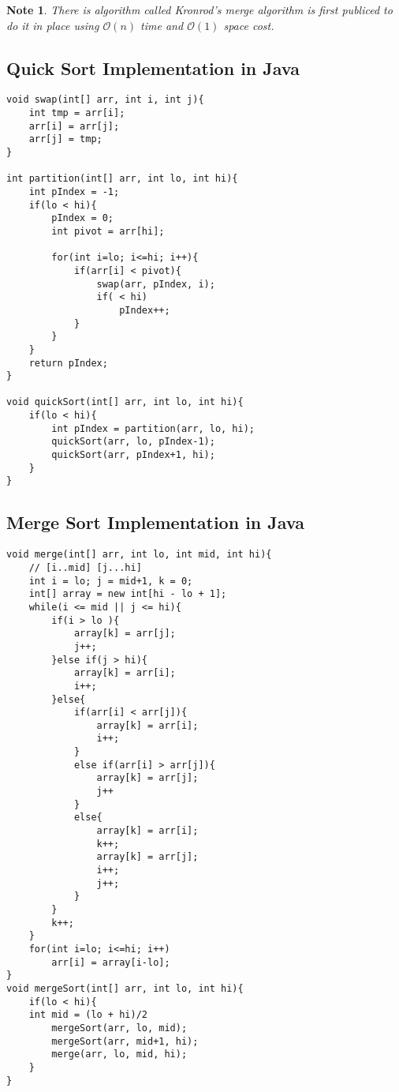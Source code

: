 \documentclass{article}
\newtheorem{note}{Note}
\begin{document}
\begin{note}
There is algorithm called Kronrod's merge algorithm is first publiced to do it in place using $\mathcal{O}(n)$ time and $\mathcal{O}(1)$ space cost.
\end{note}

\pagebreak

\subsection{Quick Sort Implementation in Java} 
\lstset{language=Java,
basicstyle=\ttfamily
}
\begin{lstlisting}[frame=single]
void swap(int[] arr, int i, int j){
    int tmp = arr[i];
    arr[i] = arr[j];
    arr[j] = tmp;
}

int partition(int[] arr, int lo, int hi){
    int pIndex = -1;
    if(lo < hi){
        pIndex = 0;
        int pivot = arr[hi];

        for(int i=lo; i<=hi; i++){
            if(arr[i] < pivot){
                swap(arr, pIndex, i);
                if( < hi)
                    pIndex++;
            }
        }
    }
    return pIndex;
}

void quickSort(int[] arr, int lo, int hi){
    if(lo < hi){
        int pIndex = partition(arr, lo, hi);
        quickSort(arr, lo, pIndex-1);
        quickSort(arr, pIndex+1, hi);
    }
}
\end{lstlisting}

\pagebreak
\subsection{Merge Sort Implementation in Java} 
\lstset{language=Java}
\begin{lstlisting}[frame=single]
void merge(int[] arr, int lo, int mid, int hi){
    // [i..mid] [j...hi]
    int i = lo; j = mid+1, k = 0;
    int[] array = new int[hi - lo + 1];
    while(i <= mid || j <= hi){
        if(i > lo ){            
            array[k] = arr[j];
            j++;
        }else if(j > hi){
            array[k] = arr[i];
            i++;
        }else{
            if(arr[i] < arr[j]){
                array[k] = arr[i];
                i++;
            }
            else if(arr[i] > arr[j]){
                array[k] = arr[j];
                j++
            }
            else{
                array[k] = arr[i];
                k++;
                array[k] = arr[j];
                i++;
                j++;
            }
        }
        k++;
    }
    for(int i=lo; i<=hi; i++)
        arr[i] = array[i-lo];
}
void mergeSort(int[] arr, int lo, int hi){
    if(lo < hi){
    int mid = (lo + hi)/2
        mergeSort(arr, lo, mid);
        mergeSort(arr, mid+1, hi);
        merge(arr, lo, mid, hi);
    }
}
\end{lstlisting} 
\end{document}
